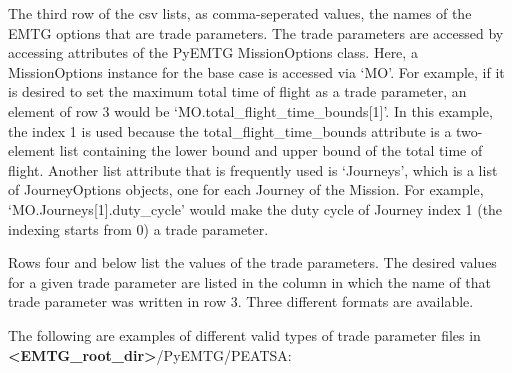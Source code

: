 \noindent The third row of the csv lists, as comma-seperated values, the names of the \ac{EMTG} options that are trade parameters. The trade parameters are accessed by accessing attributes of the PyEMTG MissionOptions class. Here, a MissionOptions instance for the base case is accessed via `MO'. For example, if it is desired to set the maximum total time of flight as a trade parameter, an element of row 3 would be `MO.total\_flight\_time\_bounds[1]'. In this example, the index 1 is used because the total\_flight\_time\_bounds attribute is a two-element list containing the lower bound and upper bound of the total time of flight. Another list attribute that is frequently used is `Journeys', which is a list of JourneyOptions objects, one for each Journey of the Mission. For example, `MO.Journeys[1].duty\_cycle' would make the duty cycle of Journey index 1 (the indexing starts from 0) a trade parameter.

\noindent Rows four and below list the values of the trade parameters. The desired values for a given trade parameter are listed in the column in which the name of that trade parameter was written in row 3. Three different formats are available.

\noindent The following are examples of different valid types of trade parameter files in \\ \textbf{\textless EMTG\_root\_dir\textgreater}/PyEMTG/PEATSA:

